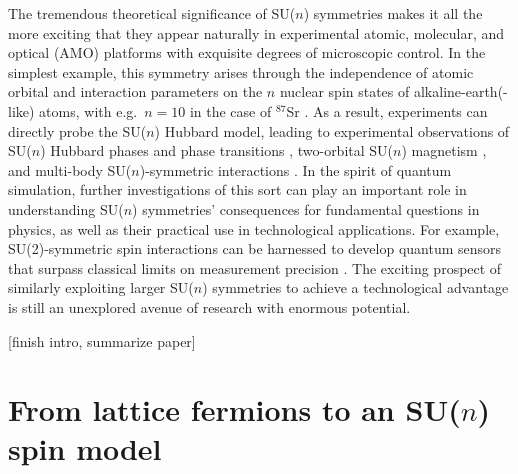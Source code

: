 \documentclass[nofootinbib,twocolumn]{revtex4-2}
\newcommand{\1}{\mathds{1}}
\newcommand{\red}[1]{{\color{red} #1}}
\begin{document}
The tremendous theoretical significance of SU($n$) symmetries makes it all the more exciting that they appear naturally in experimental atomic, molecular, and optical (AMO) platforms \cite{gorshkov2010twoorbital, beverland2016realizing, cazalilla2014ultracold, taie2012su, hofrichter2016direct, cappellini2014direct, scazza2014observation, zhang2014spectroscopic, goban2018emergence, perlin2019effective} with exquisite degrees of microscopic control.
In the simplest example, this symmetry arises through the independence of atomic orbital and interaction parameters on the $n$ nuclear spin states of alkaline-earth(-like) atoms, with e.g.~$n=10$ in the case of ${}^{87}$Sr \cite{cazalilla2014ultracold}.
As a result, experiments can directly probe the SU($n$) Hubbard model, leading to experimental observations of SU($n$) Hubbard phases and phase transitions \cite{taie2012su, hofrichter2016direct}, two-orbital SU($n$) magnetism \cite{cappellini2014direct, scazza2014observation, zhang2014spectroscopic}, and multi-body SU($n$)-symmetric interactions \cite{goban2018emergence, perlin2019effective}.
In the spirit of quantum simulation, further investigations of this sort can play an important role in understanding SU($n$) symmetries' consequences for fundamental questions in physics, as well as their practical use in technological applications.
For example, SU(2)-symmetric spin interactions can be harnessed to develop quantum sensors that surpass classical limits on measurement precision \cite{he2019engineering, perlin2020spin}.
The exciting prospect of similarly exploiting larger SU($n$) symmetries to achieve a technological advantage is still an unexplored avenue of research with enormous potential.

\red{[finish intro, summarize paper]}

\section{From lattice fermions to an SU($n$) spin model}
\label{sec:spin_model}
\end{document}
